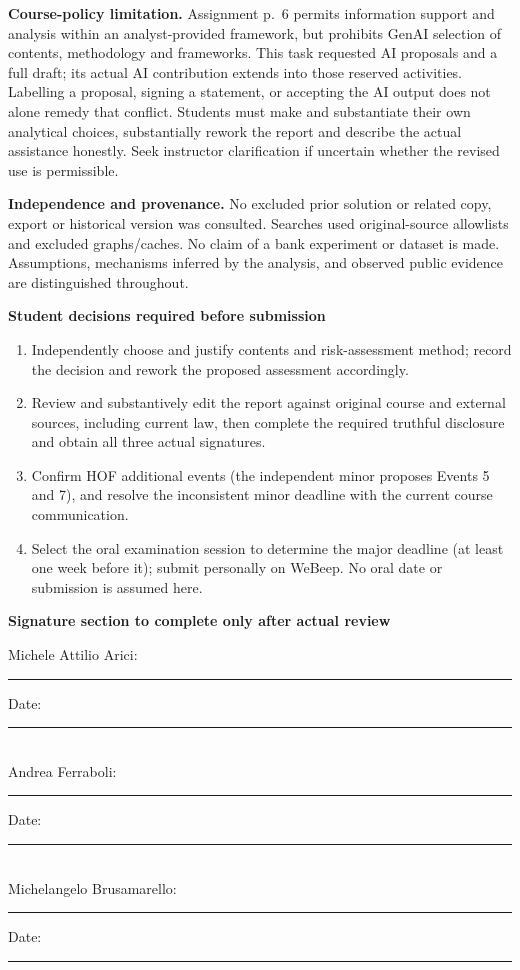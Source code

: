 \documentclass[11pt,a4paper]{article}
\newcommand{\sub}[1]{\par\vspace{2mm}\textbf{\color{ink}#1}\par}
\begin{document}
\textbf{Course-policy limitation.} Assignment p.~6 permits information support and analysis within an analyst-provided framework, but prohibits GenAI selection of contents, methodology and frameworks. This task requested AI proposals and a full draft; its actual AI contribution extends into those reserved activities. Labelling a proposal, signing a statement, or accepting the AI output does not alone remedy that conflict. Students must make and substantiate their own analytical choices, substantially rework the report and describe the actual assistance honestly. Seek instructor clarification if uncertain whether the revised use is permissible.

\textbf{Independence and provenance.} No excluded prior solution or related copy, export or historical version was consulted. Searches used original-source allowlists and excluded graphs/caches. No claim of a bank experiment or dataset is made. Assumptions, mechanisms inferred by the analysis, and observed public evidence are distinguished throughout.
\sub{Student decisions required before submission}
\begin{enumerate}[itemsep=4pt]
\item Independently choose and justify contents and risk-assessment method; record the decision and rework the proposed assessment accordingly.
\item Review and substantively edit the report against original course and external sources, including current law, then complete the required truthful disclosure and obtain all three actual signatures.
\item Confirm HOF additional events (the independent minor proposes Events 5 and 7), and resolve the inconsistent minor deadline with the current course communication.
\item Select the oral examination session to determine the major deadline (at least one week before it); submit personally on WeBeep. No oral date or submission is assumed here.
\end{enumerate}
\sub{Signature section to complete only after actual review}
Michele Attilio Arici: \rule{55mm}{0.4pt}\quad Date: \rule{24mm}{0.4pt}\\[3mm]
Andrea Ferraboli: \rule{61mm}{0.4pt}\quad Date: \rule{24mm}{0.4pt}\\[3mm]
Michelangelo Brusamarello: \rule{48mm}{0.4pt}\quad Date: \rule{24mm}{0.4pt}
\end{document}
